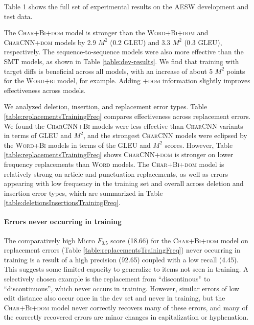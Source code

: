 \documentclass[11pt,letterpaper]{article}
\begin{document}
Table 1 shows the full set of experimental results on the AESW development and test data. 

The \textsc{Char+Bi+dom} model is stronger than the \textsc{Word+Bi+dom} and \textsc{CharCNN+dom} models by 2.9 $M^2$ (0.2 GLEU) and 3.3 $M^2$ (0.3 GLEU), respectively. 
The sequence-to-sequence models were also more effective than the \textsc{SMT} models, as shown in Table \ref{table:dev-results}. We find that training with target diffs is beneficial across all models, with an increase of about 5 $M^2$ points for the \textsc{Word+bi} model, for example. Adding \textsc{+dom} information slightly improves effectiveness across models.

We analyzed deletion, insertion, and replacement error types.
Table \ref{table:replacementsTrainingFreq} compares effectiveness across replacement errors. We found the \textsc{CharCNN+Bi} models were less effective than \textsc{CharCNN} variants in terms of GLEU and $M^2$, and the strongest \textsc{CharCNN} models were eclipsed by the \textsc{Word+Bi} models in terms of the GLEU and $M^2$ scores. However, Table \ref{table:replacementsTrainingFreq} shows \textsc{CharCNN+dom} is stronger on lower frequency replacements than \textsc{Word} models. The \textsc{Char+Bi+dom} model is relatively strong on article and punctuation replacements, as well as errors appearing with low frequency in the training set and overall across deletion and insertion error types, which are summarized in Table \ref{table:deletionsInsertionsTrainingFreq}. 

\paragraph{Errors never occurring in training} 
The comparatively high Micro $F_{0.5}$ score (18.66) for the \textsc{Char+Bi+dom} model on replacement errors (Table  \ref{table:replacementsTrainingFreq}) never occurring in training is a result of a high precision (92.65) coupled with a low recall (4.45). This suggests some limited capacity to generalize to items not seen in training. A selectively chosen example is the replacement from ``discontinous'' to ``discontinuous'', which never occurs in training. However, similar errors of low edit distance also occur once in the dev set and never in training, but the \textsc{Char+Bi+dom} model never correctly recovers many of these errors, and many of the correctly recovered errors are minor changes in capitalization or hyphenation.
\end{document}
